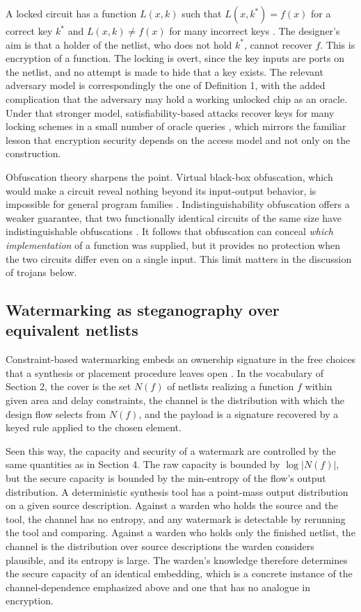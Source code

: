 \documentclass[11pt]{article}
\theoremstyle{definition}
\theoremstyle{remark}
\begin{document}
A locked circuit has a function $L(x,k)$ such that $L(x,k^\ast)=f(x)$ for a correct key $k^\ast$ and $L(x,k)\ne f(x)$ for many incorrect keys \cite{roy2008}. The designer's aim is that a holder of the netlist, who does not hold $k^\ast$, cannot recover $f$. This is encryption of a function. The locking is overt, since the key inputs are ports on the netlist, and no attempt is made to hide that a key exists. The relevant adversary model is correspondingly the one of Definition 1, with the added complication that the adversary may hold a working unlocked chip as an oracle. Under that stronger model, satisfiability-based attacks recover keys for many locking schemes in a small number of oracle queries \cite{subramanyan2015}, which mirrors the familiar lesson that encryption security depends on the access model and not only on the construction.

Obfuscation theory sharpens the point. Virtual black-box obfuscation, which would make a circuit reveal nothing beyond its input-output behavior, is impossible for general program families \cite{barak2001}. Indistinguishability obfuscation offers a weaker guarantee, that two functionally identical circuits of the same size have indistinguishable obfuscations \cite{garg2013}. It follows that obfuscation can conceal \emph{which implementation} of a function was supplied, but it provides no protection when the two circuits differ even on a single input. This limit matters in the discussion of trojans below.

\subsection{Watermarking as steganography over equivalent netlists}

Constraint-based watermarking embeds an ownership signature in the free choices that a synthesis or placement procedure leaves open \cite{kahng1998}. In the vocabulary of Section 2, the cover is the set $N(f)$ of netlists realizing a function $f$ within given area and delay constraints, the channel is the distribution with which the design flow selects from $N(f)$, and the payload is a signature recovered by a keyed rule applied to the chosen element.

Seen this way, the capacity and security of a watermark are controlled by the same quantities as in Section 4. The raw capacity is bounded by $\log|N(f)|$, but the secure capacity is bounded by the min-entropy of the flow's output distribution. A deterministic synthesis tool has a point-mass output distribution on a given source description. Against a warden who holds the source and the tool, the channel has no entropy, and any watermark is detectable by rerunning the tool and comparing. Against a warden who holds only the finished netlist, the channel is the distribution over source descriptions the warden considers plausible, and its entropy is large. The warden's knowledge therefore determines the secure capacity of an identical embedding, which is a concrete instance of the channel-dependence emphasized above and one that has no analogue in encryption.
\end{document}
